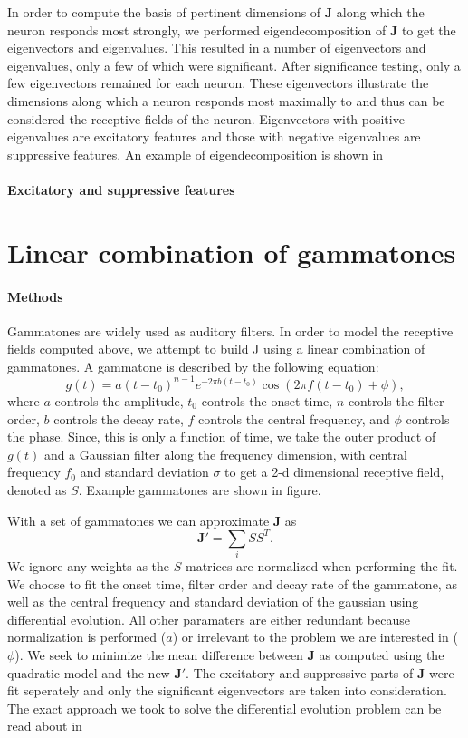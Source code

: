 \documentclass{article}
\begin{document}
In order to compute the basis of pertinent dimensions of $\mathbf{J}$ along which the neuron responds most strongly, we performed eigendecomposition of $\mathbf{J}$ to get the eigenvectors and eigenvalues. This resulted in a number of eigenvectors and eigenvalues, only a few of which were significant. %
After significance testing, only a few eigenvectors remained for each neuron. These eigenvectors illustrate the dimensions along which a neuron responds most maximally to and thus can be considered the receptive fields of the neuron. Eigenvectors with positive eigenvalues are excitatory features and those with negative eigenvalues are suppressive features. An example of eigendecomposition is shown in %

\paragraph{Excitatory and suppressive features}


\section{Linear combination of gammatones}
\paragraph{Methods}
Gammatones are widely used as auditory filters. In order to model the receptive fields computed above, we attempt to build J using a linear combination of gammatones. A gammatone is described by the following equation:$$g(t) = a(t-t_0)^{n-1}e^{-2\pi b(t-t_0)}\cos({2\pi f (t-t_0) + \phi}),
$$ where $a$ controls the amplitude, $t_0$ controls the onset time, $n$ controls the filter order, $b$ controls the decay rate, $f$ controls the central frequency, and $\phi$ controls the phase. Since, this is only a function of time, we take the outer product of $g(t)$ and a Gaussian filter along the frequency dimension, with central frequency $f_0$ and standard deviation $\sigma$ to get a 2-d dimensional receptive field, denoted as $S$. Example gammatones are shown in figure. %

With a set of gammatones we can approximate $\mathbf{J}$ as $$\mathbf{J'} = \sum_{i}{SS^T}.$$ We ignore any weights as the $S$ matrices are normalized when performing the fit. We choose to fit the onset time, filter order and decay rate of the gammatone, as well as the central frequency and standard deviation of the gaussian using differential evolution. All other paramaters are either redundant because normalization is performed ($a$) or irrelevant to the problem we are interested in ($\phi$).  We seek to minimize the mean difference between $\mathbf{J}$ as computed using the quadratic model and the new $\mathbf{J'}$. The excitatory and suppressive parts of $\mathbf{J}$ were fit seperately and only the significant eigenvectors are taken into consideration. The exact approach we took to solve the differential evolution problem can be read about in %
\end{document}
